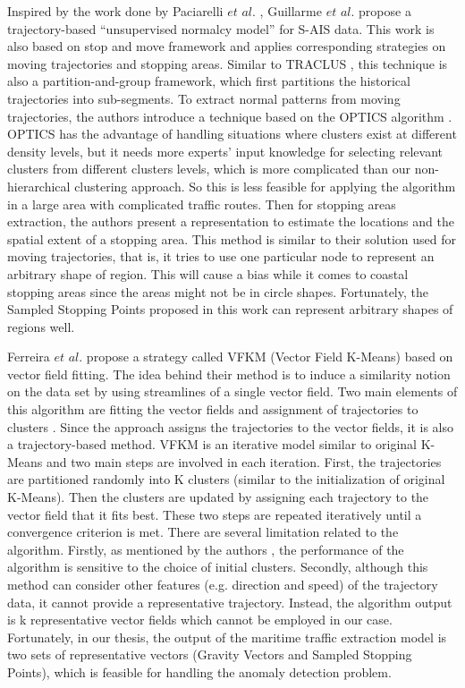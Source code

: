 \documentclass[12pt,glossary]{dalcsthesis}
\begin{document}
Inspired by the work done by Paciarelli $et$ $al$.  \cite{videosurveillance1}\cite{videosurveillance2}, Guillarme $et$ $al$. propose a trajectory-based ``unsupervised normalcy model'' \cite{Nicolas} for  S-AIS data. This work is also based on stop and move framework \cite{stopmove} and applies corresponding strategies on moving trajectories and stopping areas. Similar to TRACLUS \cite{Lee07}, this technique is also a partition-and-group framework, which first partitions the historical trajectories into sub-segments. To extract normal patterns from moving trajectories, the authors introduce a technique based on the OPTICS algorithm \cite{optics}. OPTICS has the advantage of handling situations where clusters exist at different density levels, but it needs more experts' input knowledge for selecting relevant clusters from different clusters levels, which is more complicated than our non-hierarchical clustering approach.  So this is less feasible for applying the algorithm in a large area with complicated traffic routes. Then for stopping areas extraction, the authors present a representation to estimate the locations and the spatial extent of a stopping area. This method is similar to their solution used for moving trajectories, that is, it tries to use one particular node to represent an arbitrary shape of region. This will cause a bias while it comes to coastal stopping areas since the areas might not be in circle shapes. Fortunately, the Sampled Stopping Points proposed in this work can represent arbitrary shapes of regions well.


Ferreira $et$ $al$. \cite{vfkm} propose a strategy called VFKM (Vector Field K-Means) based on vector field fitting. The idea behind their method is to induce a similarity notion on the data set by using streamlines of a single vector field. Two main elements of this algorithm are fitting the vector fields and assignment of trajectories to clusters \cite{vfkm}. Since the approach assigns the trajectories to the vector fields, it is also a trajectory-based method. VFKM is an iterative model similar to original K-Means \cite{kmeans} and two main steps are involved in each iteration. First, the trajectories are partitioned randomly into K clusters (similar to the initialization of original K-Means). Then the clusters are updated by assigning each trajectory to the vector field that it fits best. These two steps are repeated iteratively until a convergence criterion is met. There are several limitation related to the algorithm. Firstly, as mentioned by the authors \cite{vfkm}, the performance of the algorithm is sensitive to the choice of initial clusters. Secondly, although this method can consider other features (e.g. direction and speed) of the trajectory data, it cannot provide a representative trajectory. Instead, the algorithm output is k representative vector fields which cannot be employed in our case. Fortunately, in our thesis, the output of the maritime traffic extraction model is two sets of representative vectors (Gravity Vectors and Sampled Stopping Points), which is feasible for handling the anomaly detection problem.
\end{document}
